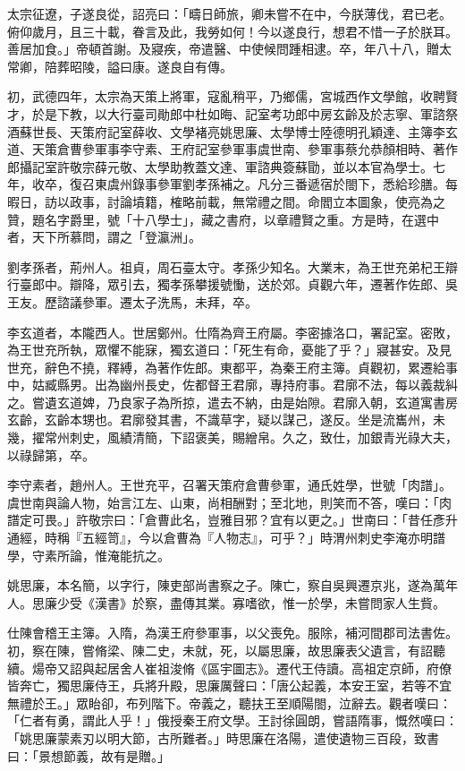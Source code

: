 \begin{pinyinscope}
 太宗征遼，子遂良從，詔亮曰：「疇日師旅，卿未嘗不在中，今朕薄伐，君已老。俯仰歲月，且三十載，眷言及此，我勞如何！今以遂良行，想君不惜一子於朕耳。善居加食。」帝頓首謝。及寢疾，帝遣醫、中使候問踵相逮。卒，年八十八，贈太常卿，陪葬昭陵，謚曰康。遂良自有傳。



 初，武德四年，太宗為天策上將軍，寇亂稍平，乃鄉儒，宮城西作文學館，收聘賢才，於是下教，以大行臺司勛郎中杜如晦、記室考功郎中房玄齡及於志寧、軍諮祭酒蘇世長、天策府記室薛收、文學褚亮姚思廉、太學博士陸德明孔穎達、主簿李玄道、天策倉曹參軍事李守素、王府記室參軍事虞世南、參軍事蔡允恭顏相時、著作郎攝記室許敬宗薛元敬、太學助教蓋文達、軍諮典簽蘇勖，並以本官為學士。七年，收卒，復召東虞州錄事參軍劉孝孫補之。凡分三番遞宿於閤下，悉給珍膳。每暇日，訪以政事，討論墳籍，榷略前載，無常禮之間。命閻立本圖象，使亮為之贊，題名字爵里，號「十八學士」，藏之書府，以章禮賢之重。方是時，在選中者，天下所慕問，謂之「登瀛洲」。



 劉孝孫者，荊州人。祖貞，周石臺太守。孝孫少知名。大業末，為王世充弟杞王辯行臺郎中。辯降，眾引去，獨孝孫攀援號慟，送於郊。貞觀六年，遷著作佐郎、吳王友。歷諮議參軍。遷太子洗馬，未拜，卒。



 李玄道者，本隴西人。世居鄭州。仕隋為齊王府屬。李密據洛口，署記室。密敗，為王世充所執，眾懼不能寐，獨玄道曰：「死生有命，憂能了乎？」寢甚安。及見世充，辭色不撓，釋縛，為著作佐郎。東都平，為秦王府主簿。貞觀初，累遷給事中，姑臧縣男。出為幽州長史，佐都督王君廓，專持府事。君廓不法，每以義裁糾之。嘗遺玄道婢，乃良家子為所掠，遣去不納，由是始隙。君廓入朝，玄道寓書房玄齡，玄齡本甥也。君廓發其書，不識草字，疑以謀己，遂反。坐是流巂州，未幾，擢常州刺史，風績清簡，下詔褒美，賜繒帛。久之，致仕，加銀青光祿大夫，以祿歸第，卒。



 李守素者，趙州人。王世充平，召署天策府倉曹參軍，通氏姓學，世號「肉譜」。虞世南與論人物，始言江左、山東，尚相酬對；至北地，則笑而不答，嘆曰：「肉譜定可畏。」許敬宗曰：「倉曹此名，豈雅目邪？宜有以更之。」世南曰：「昔任彥升通經，時稱『五經笥』，今以倉曹為『人物志』，可乎？」時渭州刺史李淹亦明譜學，守素所論，惟淹能抗之。



 姚思廉，本名簡，以字行，陳吏部尚書察之子。陳亡，察自吳興遷京兆，遂為萬年人。思廉少受《漢書》於察，盡傳其業。寡嗜欲，惟一於學，未嘗問家人生貲。



 仕陳會稽王主簿。入隋，為漢王府參軍事，以父喪免。服除，補河間郡司法書佐。初，察在陳，嘗脩梁、陳二史，未就，死，以屬思廉，故思廉表父遺言，有詔聽續。煬帝又詔與起居舍人崔祖浚脩《區宇圖志》。遷代王侍讀。高祖定京師，府僚皆奔亡，獨思廉侍王，兵將升殿，思廉厲聲曰：「唐公起義，本安王室，若等不宜無禮於王。」眾眙卻，布列階下。帝義之，聽扶王至順陽閤，泣辭去。觀者嘆曰：「仁者有勇，謂此人乎！」俄授秦王府文學。王討徐圓朗，嘗語隋事，慨然嘆曰：「姚思廉蒙素刃以明大節，古所難者。」時思廉在洛陽，遣使遺物三百段，致書曰：「景想節義，故有是贈。」




\end{pinyinscope}
